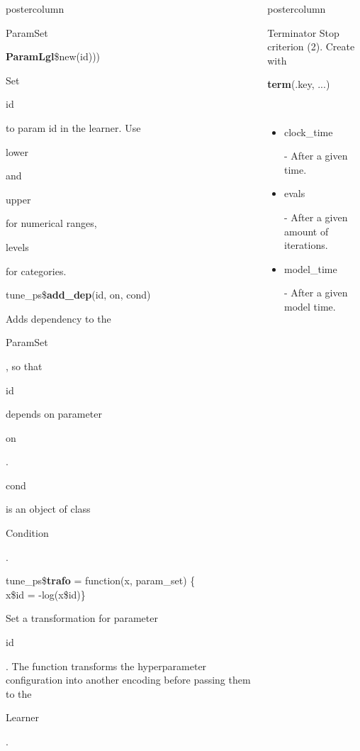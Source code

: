 \documentclass{beamer}
\newlength{\columnheight} %
\newcommand{\codeinline}[1]{\begin{codeboxinline}#1\end{codeboxinline}}
\begin{document}
\begin{frame}[fragile]{}
\begin{columns}
\begin{column}{.245\textwidth}
\begin{beamercolorbox}[center]{postercolumn}
\begin{minipage}{.98\textwidth}
{\begin{myblock}{ParamSet}
\begin{codeboxmultiline}[width=21cm]
								\hspace*{1ex}\textbf{ParamLgl}\$new(id)))
							\end{codeboxmultiline}
                            Set \codeinline{id} to param id in the learner. Use \codeinline{lower} and \codeinline{upper} for numerical ranges, \codeinline{levels} for categories. 
							\\
							\begin{codebox}
								tune\_ps\$\textbf{add\_dep}(id, on, cond)
							\end{codebox}
							Adds dependency to the \codeinline{ParamSet}, so that \codeinline{id} depends on parameter \codeinline{on}.
							\codeinline{cond} is an object of class \codeinline{Condition}.
							\\
							\begin{codeboxmultiline}[width=26cm]
								tune\_ps\$\textbf{trafo} = function(x, param\_set) \{ \\
								\hspace*{1ex}x\$id = -log(x\$id)\}
							\end{codeboxmultiline}
							Set a transformation for parameter \codeinline{id}. 
							The function transforms the hyperparameter configuration into another encoding 
							before passing them to the \codeinline{Learner}.
						\end{myblock}
						\vfill}
				\end{minipage}
			\end{beamercolorbox}
		\end{column}
		\begin{column}{.245\textwidth}
			\begin{beamercolorbox}[center]{postercolumn}
				\begin{minipage}{.98\textwidth}
					\parbox[t][\columnheight]{\textwidth}{
						\begin{myblock}{Terminator}
							Stop criterion (2). Create with \codeinline{\textbf{term}(.key, ...)}
							\\
							\begin{itemize}
								\item \codeinline{clock\_time} - After a given time.
								\item \codeinline{evals} - After a given amount of iterations.
								\item \codeinline{model\_time}  - After a given model time.

\end{itemize}
\end{myblock}}
\end{minipage}
\end{beamercolorbox}
\end{column}
\end{columns}
\end{frame}
\end{document}
